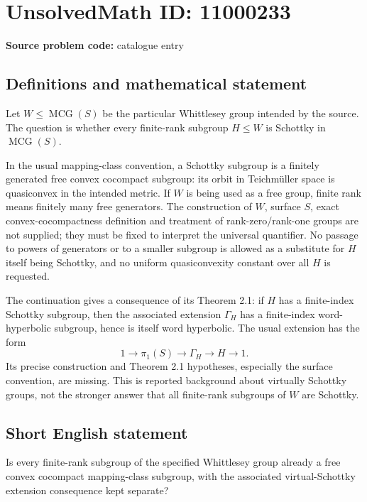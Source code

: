 \documentclass[11pt]{article}
\begin{document}
\section*{UnsolvedMath ID: 11000233}
\textbf{Source problem code:} catalogue entry
\subsection{Definitions and mathematical statement}
Let \(W\leq\operatorname{MCG}(S)\) be the particular Whittlesey group intended by the source. The question is whether every finite-rank subgroup \(H\leq W\) is Schottky in \(\operatorname{MCG}(S)\).

In the usual mapping-class convention, a Schottky subgroup is a finitely generated free convex cocompact subgroup: its orbit in Teichm\"uller space is quasiconvex in the intended metric. If \(W\) is being used as a free group, finite rank means finitely many free generators. The construction of \(W\), surface \(S\), exact convex-cocompactness definition and treatment of rank-zero/rank-one groups are not supplied; they must be fixed to interpret the universal quantifier. No passage to powers of generators or to a smaller subgroup is allowed as a substitute for \(H\) itself being Schottky, and no uniform quasiconvexity constant over all \(H\) is requested.

The continuation gives a consequence of its Theorem 2.1: if \(H\) has a finite-index Schottky subgroup, then the associated extension \(\Gamma_H\) has a finite-index word-hyperbolic subgroup, hence is itself word hyperbolic. The usual extension has the form
\[
 1\longrightarrow\pi_1(S)\longrightarrow\Gamma_H\longrightarrow H\longrightarrow1.
\]
Its precise construction and Theorem 2.1 hypotheses, especially the surface convention, are missing. This is reported background about virtually Schottky groups, not the stronger answer that all finite-rank subgroups of \(W\) are Schottky.
\subsection{Short English statement}
Is every finite-rank subgroup of the specified Whittlesey group already a free convex cocompact mapping-class subgroup, with the associated virtual-Schottky extension consequence kept separate?
\end{document}
